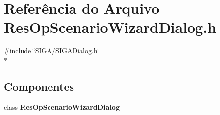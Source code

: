 \section{Referência do Arquivo Res\+Op\+Scenario\+Wizard\+Dialog.\+h}
\label{_res_op_scenario_wizard_dialog_8h}
{\ttfamily \#include \char`\"{}S\+I\+G\+A/\+S\+I\+G\+A\+Dialog.\+h\char`\"{}}\\*
\subsection*{Componentes}
\begin{DoxyCompactItemize}
\item 
class {\bf Res\+Op\+Scenario\+Wizard\+Dialog}
\end{DoxyCompactItemize}
